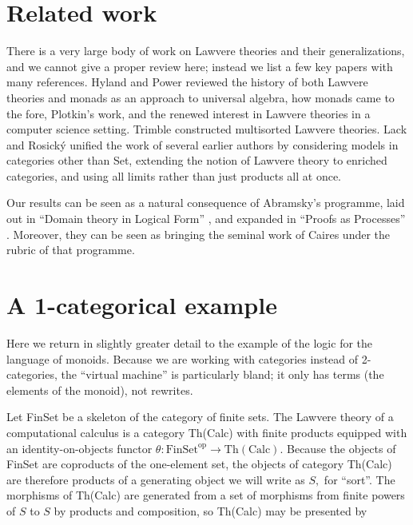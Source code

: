 \documentclass{llncs}
\newcommand{\maps}{\colon}
\newcommand{\FinSet}{\mathrm{FinSet}}
\newcommand{\op}{\mathrm{op}}
\begin{document}
\section{Related work}

There is a very large body of work on Lawvere theories and their generalizations, and we cannot give a proper review here; instead we list a few key papers with many references.  Hyland and Power \cite{DBLP:journals/entcs/HylandP07} reviewed the history of both Lawvere theories and monads as an approach to universal algebra, how monads came to the fore, Plotkin's work, and the renewed interest in Lawvere theories in a computer science setting.  Trimble \cite{Trimble} constructed multisorted Lawvere theories.  Lack and Rosick\'y \cite{DBLP:journals/acs/LackR11} unified the work of several earlier authors by considering models in categories other than Set, extending the notion of Lawvere theory to enriched categories, and using all limits rather than just products all at once.

Our results can be seen as a natural consequence of Abramsky's programme, laid out in ``Domain theory in Logical Form'' \cite{DBLP:journals/apal/Abramsky91}, and expanded in ``Proofs as Processes'' \cite{Abramsky:1992:PP:194588.194591}.  Moreover, they can be seen as bringing the seminal work of Caires \cite{Caires} under the rubric of that programme.

\section{A 1-categorical example}

Here we return in slightly greater detail to the example of the logic for the language of monoids.  Because we are working with categories instead of 2-categories, the ``virtual machine'' is particularly bland; it only has terms (the elements of the monoid), not rewrites.

Let FinSet be a skeleton of the category of finite sets.  The Lawvere
theory of a computational calculus is a category Th(Calc) with finite
products equipped with an identity-on-objects functor $\theta\maps
\FinSet^\op \to \mathrm{Th(Calc)}.$  Because the objects of FinSet are
coproducts of the one-element set, the objects of category Th(Calc)
are therefore products of a generating object we will write as $S,$
for ``sort''.  The morphisms of Th(Calc) are generated from a set of
morphisms from finite powers of $S$ to $S$ by products and
composition, so Th(Calc) may be presented by
\end{document}
